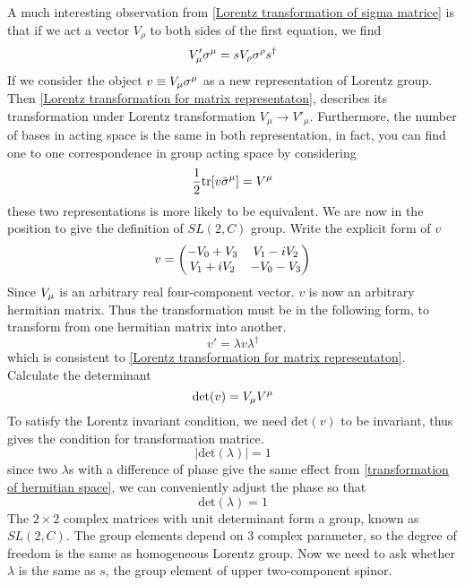 A much interesting observation from \eqref{Lorentz transformation of sigma matrice} is that if we act a vector $V_{\rho}$ to both sides of the first equation, we find
\begin{equation} \label{Lorentz transformation for matrix representaton}
  V'_{\mu}\sigma^{\mu} = s V_{\rho}\sigma^{\rho}{s}^{\dagger}
\end{equation}
If we consider the object $v\equiv V_\mu \sigma^{\mu}$ as a new representation of Lorentz group. Then \eqref{Lorentz transformation for matrix representaton}, describes its transformation under Lorentz transformation $V_{\mu}\rightarrow V'_{\mu}$.
Furthermore, the number of bases in acting space is the same in both representation, in fact, you can find one to one correspondence in group acting space by considering
\begin{equation} \label{reflection to the vector representation}
\frac{1}{2} \text{tr}[v\bar{\sigma}^{\mu}] = V^{\mu}
\end{equation}
these two representations is more likely to be equivalent.
We are now in the position to give the definition of $SL(2,C)$ group. Write the explicit form of $v$
\begin{equation}
  v = \mqty(-V_0 +  V_3 & V_1 - i V_2
                \\ V_1 +i V_2 & -V_0 -  V_3)
\end{equation}
Since $V_{\mu}$ is an arbitrary real four-component vector.  $v$ is now an arbitrary hermitian matrix. Thus the transformation must be in the following form, to transform from one hermitian matrix into another.
\begin{equation} \label{transformation of hermitian space}
v' = \lambda v \lambda^{\dagger}
\end{equation}
which is consistent to \eqref{Lorentz transformation for matrix representaton}. Calculate the determinant
\begin{equation}
  \text{det}(v) = V_\mu V^\mu
\end{equation}
To satisfy the Lorentz invariant condition, we need $\text{det}(v)$ to be invariant, thus gives the condition for transformation matrice.
\begin{equation}
  |\text{det}(\lambda)| = 1
\end{equation}
since two $\lambda$s with a difference of phase give the same effect from \eqref{transformation of hermitian space}, we can conveniently adjust the phase so that
\begin{equation} \label{SL(2,C) condition}
\text{det}(\lambda) = 1
\end{equation}
The $2\times2$ complex matrices with unit determinant form a group, known as \textbf{$SL(2,C)$}. The group elements depend on 3 complex parameter, so the degree of freedom is the same as homogeneous Lorentz group. Now we need to ask whether $\lambda$ is the same as $s$, the group element of upper two-component spinor.

